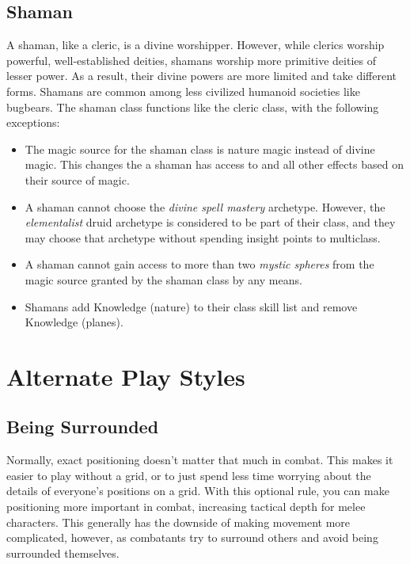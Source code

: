     \subsection{Shaman}
        A shaman, like a cleric, is a divine worshipper.
        However, while clerics worship powerful, well-established deities, shamans worship more primitive deities of lesser power.
        As a result, their divine powers are more limited and take different forms.
        Shamans are common among less civilized humanoid societies like bugbears.
        The shaman class functions like the cleric class, with the following exceptions:
        \begin{itemize}
            \item The magic source for the shaman class is nature magic instead of divine magic.
                This changes the  a shaman has access to and all other effects based on their source of magic.
            \item A shaman cannot choose the \textit{divine spell mastery} archetype. However, the \textit{elementalist} druid archetype is considered to be part of their class, and they may choose that archetype without spending insight points to multiclass.
            \item A shaman cannot gain access to more than two \textit{mystic spheres} from the magic source granted by the shaman class by any means.
            \item Shamans add Knowledge (nature) to their class skill list and remove Knowledge (planes).
        \end{itemize}

\section{Alternate Play Styles}

    \subsection{Being Surrounded}\label{Being Surrounded}
        Normally, exact positioning doesn't matter that much in combat.
        This makes it easier to play without a grid, or to just spend less time worrying about the details of everyone's positions on a grid.
        With this optional rule, you can make positioning more important in combat, increasing tactical depth for melee characters.
        This generally has the downside of making movement more complicated, however, as combatants try to surround others and avoid being surrounded themselves.

